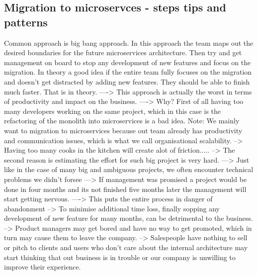 \documentclass[a4paper, 11pt]{book}
\begin{document}
    \subsection{Migration to microservces - steps tips and patterns}
    Common approach is big bang approach.
    In this approach the team maps out the desired boundaries for the future microservices architecture.
    Then try and get management on board to stop any development of new features and focus on the migration.
    In theory a good idea if the entire team fully focuses on the migration and doesn't get distracted by adding new features. They should be able to finish much faster.
    That is in theory.
    ----> This approach is actually the worst in terms of productivity and impact on the business.
    ----> Why?
    First of all having too many developers working on the same project, which in this case is the refactoring of the monolith into microservices is a bad idea.
    Note: We mainly want to migration to microservices because out team already has productivity and communication issues, which is what we call organisational scalability.
    --> Having too many cooks in the kitchen will create alot of friction.....
    --> The second reason is estimating the effort for such big project is very hard.
    ---> Just like in the case of many big and ambiguous projects, we often encounter technical problems we didn't forsee
    ---> If management was promised a project would be done in four months and its not finished five months later the management will start getting nervous.
    ----> This puts the entire process in danger of abandonment
    --> To minimise additional time loss, finally sopping any development of new feature for many months, can be detrimental to the business.
    --> Product managers may get bored and have no way to get promoted, which in turn may cause them to leave the company.
    --> Salespeople have nothing to sell or pitch to clients and users who don't care about the internal architecture may start thinking that out business is in trouble or our company is unwilling to improve their experience.
\end{document}
